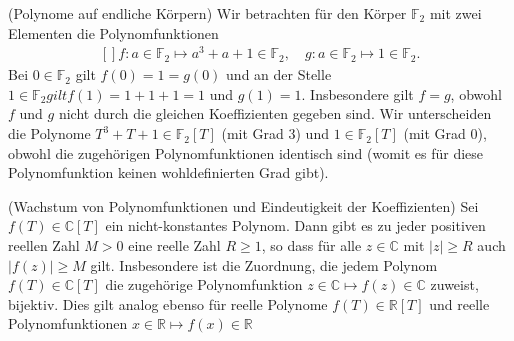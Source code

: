 \documentclass[../Analysis1_script.tex]{subfiles}
\begin{document}
\begin{example}{(Polynome auf endliche Körpern)}
	Wir betrachten für den Körper $\mathbb {F}_2$ mit zwei Elementen die Polynomfunktionen 
	\[\begin{aligned}[]
		f:a\in \mathbb {F}_2 \mapsto a^3+a+1 \in \mathbb {F}_2,\quad g:a\in \mathbb {F}_2 \mapsto 1 \in \mathbb {F}_2.
	\end{aligned}\]
	Bei $0\in \mathbb {F}_2$ gilt $f(0) = 1 = g(0)$ und an der Stelle $1\in \mathbb {F}_2 gilt f(1) = 1+1+1 = 1$ und $g(1) = 1$. Insbesondere gilt $f=g$, obwohl $f$ und $g$ nicht durch die gleichen Koeffizienten gegeben sind. Wir unterscheiden die Polynome $T^3+T+1\in \mathbb {F}_2[T]$ (mit Grad $3$) und $1\in \mathbb {F}_2[T]$ (mit Grad $0$), obwohl die zugehörigen Polynomfunktionen identisch sind (womit es für diese Polynomfunktion keinen wohldefinierten Grad gibt). 
\end{example}

\begin{proposition}{(Wachstum von Polynomfunktionen und Eindeutigkeit der Koeffizienten)}
	Sei $f(T) \in \mathbb {C}[T]$ ein nicht-konstantes Polynom. Dann gibt es zu jeder positiven reellen Zahl $M > 0$ eine reelle Zahl $R \geq 1$, so dass für alle $z \in \mathbb {C}$ mit $|z| \geq R$ auch $|f(z)| \geq M$ gilt. Insbesondere ist die Zuordnung, die jedem Polynom $f(T) \in \mathbb {C}[T]$ die zugehörige Polynomfunktion $z \in \mathbb {C} \mapsto f(z) \in \mathbb {C}$ zuweist, bijektiv. Dies gilt analog ebenso für reelle Polynome $f(T)\in \mathbb {R}[T]$ und reelle Polynomfunktionen $x\in \mathbb {R}\mapsto f(x)\in \mathbb {R}$
\end{proposition}
\end{document}
